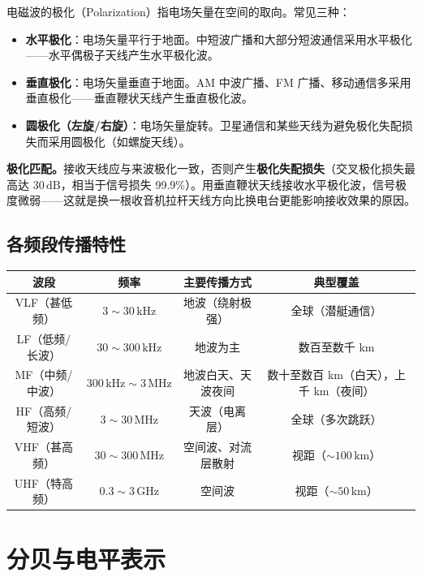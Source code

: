 \documentclass[12pt,UTF8]{ctexbook}
\begin{document}
电磁波的极化（Polarization）指电场矢量在空间的取向。常见三种：
\begin{itemize}
  \item \textbf{水平极化}：电场矢量平行于地面。中短波广播和大部分短波通信采用水平极化——水平偶极子天线产生水平极化波。
  \item \textbf{垂直极化}：电场矢量垂直于地面。AM 中波广播、FM 广播、移动通信多采用垂直极化——垂直鞭状天线产生垂直极化波。
  \item \textbf{圆极化（左旋/右旋）}：电场矢量旋转。卫星通信和某些天线为避免极化失配损失而采用圆极化（如螺旋天线）。
\end{itemize}
\textbf{极化匹配。}接收天线应与来波极化一致，否则产生\textbf{极化失配损失}（交叉极化损失最高达 $30\,\mathrm{dB}$，相当于信号损失 99.9\%）。用垂直鞭状天线接收水平极化波，信号极度微弱——这就是换一根收音机拉杆天线方向比换电台更能影响接收效果的原因。

\subsection{各频段传播特性}

\begin{center}
\begin{tabular}{c|c|c|c}
\hline
\textbf{波段} & \textbf{频率} & \textbf{主要传播方式} & \textbf{典型覆盖} \\
\hline
VLF（甚低频） & $3\sim30\,\mathrm{kHz}$ & 地波（绕射极强） & 全球（潜艇通信） \\
LF（低频/长波） & $30\sim300\,\mathrm{kHz}$ & 地波为主 & 数百至数千 km \\
MF（中频/中波） & $300\,\mathrm{kHz}\sim3\,\mathrm{MHz}$ & 地波白天、天波夜间 & 数十至数百 km（白天），上千 km（夜间） \\
HF（高频/短波） & $3\sim30\,\mathrm{MHz}$ & 天波（电离层） & 全球（多次跳跃） \\
VHF（甚高频） & $30\sim300\,\mathrm{MHz}$ & 空间波、对流层散射 & 视距（$\sim100\,\mathrm{km}$） \\
UHF（特高频） & $0.3\sim3\,\mathrm{GHz}$ & 空间波 & 视距（$\sim50\,\mathrm{km}$） \\
\hline
\end{tabular}
\end{center}

\section{分贝与电平表示}
\label{sec:decibel}
\end{document}
